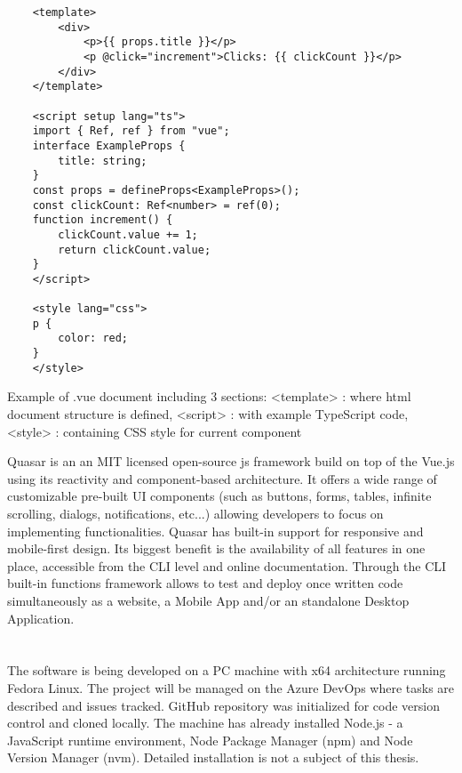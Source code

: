 \begin{listing}[H]
    \begin{verbatim}
    <template>
        <div>
            <p>{{ props.title }}</p>
            <p @click="increment">Clicks: {{ clickCount }}</p>
        </div>
    </template>
    
    <script setup lang="ts">
    import { Ref, ref } from "vue";
    interface ExampleProps {
        title: string;
    }
    const props = defineProps<ExampleProps>();
    const clickCount: Ref<number> = ref(0);
    function increment() {
        clickCount.value += 1;
        return clickCount.value;
    }
    </script>
    
    <style lang="css">
    p {
        color: red;
    }
    </style>
    \end{verbatim}
\caption[Vue document example]{Example of .vue document including 3 sections: \newline <template> : where html document structure is defined, \newline<script> : with example TypeScript code, \newline<style> : containing CSS style for current component}
\end{listing}

Quasar is an an MIT licensed open-source js framework build on top of the Vue.js using its reactivity and component-based architecture. It offers a wide range of customizable pre-built UI components (such as buttons, forms, tables, infinite scrolling, dialogs, notifications, etc...) allowing developers to focus on implementing functionalities. Quasar has built-in support for responsive and mobile-first design. Its biggest benefit is the availability of all features in one place, accessible from the CLI level and online documentation.
Through the CLI built-in functions framework allows to test and deploy once written code simultaneously as a website, a Mobile App and/or an standalone Desktop Application. \autocite{QuasarStart}

\section{}%
\label{sec:prerequisites}

The software is being developed on a PC machine with x64 architecture running Fedora Linux. The project  will be managed on the Azure DevOps where tasks are described and issues tracked. GitHub repository was initialized for code version control and cloned locally. The machine has already installed Node.js - a JavaScript runtime environment, Node Package Manager (npm) and Node Version Manager (nvm). Detailed installation is not a subject of this thesis.

